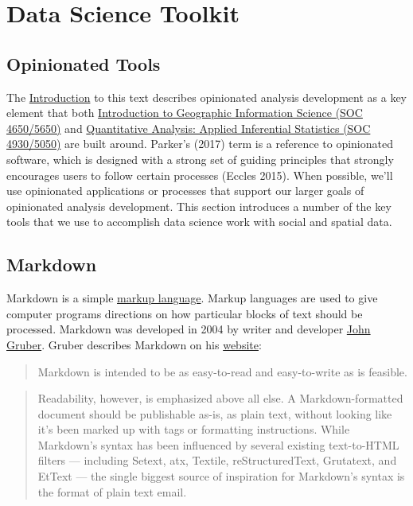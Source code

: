 \documentclass[]{book}
\theoremstyle{definition}
\theoremstyle{definition}
\theoremstyle{definition}
\theoremstyle{remark}
\begin{document}
\part{Data Science Toolkit}\label{part-data-science-toolkit}

\chapter{Opinionated Tools}\label{opinionated-tools}

The \protect\hyperlink{intro}{Introduction} to this text describes
opinionated analysis development as a key element that both
\href{https://slu-soc5650.github.io}{Introduction to Geographic
Information Science (SOC 4650/5650)} and
\href{https://slu-soc5050.github.io}{Quantitative Analysis: Applied
Inferential Statistics (SOC 4930/5050)} are built around. Parker's
(2017) term is a reference to opinionated software, which is designed
with a strong set of guiding principles that strongly encourages users
to follow certain processes (Eccles 2015). When possible, we'll use
opinionated applications or processes that support our larger goals of
opinionated analysis development. This section introduces a number of
the key tools that we use to accomplish data science work with social
and spatial data.

\hypertarget{markdown}{\chapter{Markdown}\label{markdown}}

Markdown is a simple
\href{https://en.wikipedia.org/wiki/Markup_language}{markup language}.
Markup languages are used to give computer programs directions on how
particular blocks of text should be processed. Markdown was developed in
2004 by writer and developer \href{http://daringfireball.net}{John
Gruber}. Gruber describes Markdown on his
\href{http://daringfireball.net/projects/markdown/}{website}:

\begin{quote}
Markdown is intended to be as easy-to-read and easy-to-write as is
feasible.
\end{quote}

\begin{quote}
Readability, however, is emphasized above all else. A Markdown-formatted
document should be publishable as-is, as plain text, without looking
like it's been marked up with tags or formatting instructions. While
Markdown's syntax has been influenced by several existing text-to-HTML
filters --- including Setext, atx, Textile, reStructuredText, Grutatext,
and EtText --- the single biggest source of inspiration for Markdown's
syntax is the format of plain text email.
\end{quote}
\end{document}
